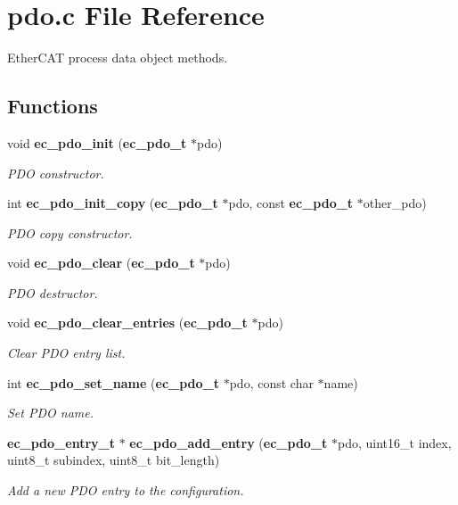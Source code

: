 \section{pdo.\-c \-File \-Reference}
\label{pdo_8c}


\-Ether\-C\-A\-T process data object methods.  


\subsection*{\-Functions}
\begin{DoxyCompactItemize}
\item 
void {\bf ec\-\_\-pdo\-\_\-init} ({\bf ec\-\_\-pdo\-\_\-t} $\ast$pdo)
\begin{DoxyCompactList}\small\item\em \-P\-D\-O constructor. \end{DoxyCompactList}\item 
int {\bf ec\-\_\-pdo\-\_\-init\-\_\-copy} ({\bf ec\-\_\-pdo\-\_\-t} $\ast$pdo, const {\bf ec\-\_\-pdo\-\_\-t} $\ast$other\-\_\-pdo)
\begin{DoxyCompactList}\small\item\em \-P\-D\-O copy constructor. \end{DoxyCompactList}\item 
void {\bf ec\-\_\-pdo\-\_\-clear} ({\bf ec\-\_\-pdo\-\_\-t} $\ast$pdo)
\begin{DoxyCompactList}\small\item\em \-P\-D\-O destructor. \end{DoxyCompactList}\item 
void {\bf ec\-\_\-pdo\-\_\-clear\-\_\-entries} ({\bf ec\-\_\-pdo\-\_\-t} $\ast$pdo)
\begin{DoxyCompactList}\small\item\em \-Clear \-P\-D\-O entry list. \end{DoxyCompactList}\item 
int {\bf ec\-\_\-pdo\-\_\-set\-\_\-name} ({\bf ec\-\_\-pdo\-\_\-t} $\ast$pdo, const char $\ast$name)
\begin{DoxyCompactList}\small\item\em \-Set \-P\-D\-O name. \end{DoxyCompactList}\item 
{\bf ec\-\_\-pdo\-\_\-entry\-\_\-t} $\ast$ {\bf ec\-\_\-pdo\-\_\-add\-\_\-entry} ({\bf ec\-\_\-pdo\-\_\-t} $\ast$pdo, uint16\-\_\-t index, uint8\-\_\-t subindex, uint8\-\_\-t bit\-\_\-length)
\begin{DoxyCompactList}\small\item\em \-Add a new \-P\-D\-O entry to the configuration. \end{DoxyCompactList}\item 

\end{DoxyCompactItemize}
